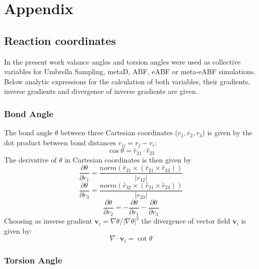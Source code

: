 \chapter{Appendix}
\label{cha:appendix}

\section{Reaction coordinates}
\label{sec:reaction coordinates}

In the present work valance angles and torsion angles were used as collective variables for Umbrella Sampling, metaD, ABF, eABF or meta-eABF simulations. Below analytic expressions for the calculation of both variables, their gradients, inverse gradients and divergence of inverse gradients are given.

\subsection{Bond Angle}
The bond angle $\theta$ between three Cartesian coordinates ($r_1, r_2, r_3$) is given by the dot product between bond distances $r_{ij}=r_j - r_i$:
\begin{equation}
  \cos \theta = \hat{r}_{21} \cdot \hat{r}_{23}
\end{equation}
The derivative of $\theta$ in Cartesian coordinates is then given by
\begin{equation}
  \frac{\partial \theta}{\partial r_1} = \frac{norm(\hat{r}_{21} \times (\hat{r}_{21} \times \hat{r}_{23}))}{|r_{12}|}
\end{equation}
\begin{equation}
  \frac{\partial \theta}{\partial r_3} = \frac{norm(\hat{r}_{32} \times (\hat{r}_{21} \times \hat{r}_{23}))}{|r_{23}|}
\end{equation}
\begin{equation}
  \frac{\partial \theta}{\partial r_2}= -\frac{\partial \theta}{\partial r_1} - \frac{\partial \theta}{\partial r_3}
\end{equation}
Choosing as inverse gradient $\textbf{v}_i = \nabla \theta/|\nabla \theta|^2$ the divergence of vector field $\textbf{v}_i$ is given by:
\begin{equation}
  \nabla \cdot \textbf{v}_i = \cot \theta
\end{equation}

\subsection{Torsion Angle}

